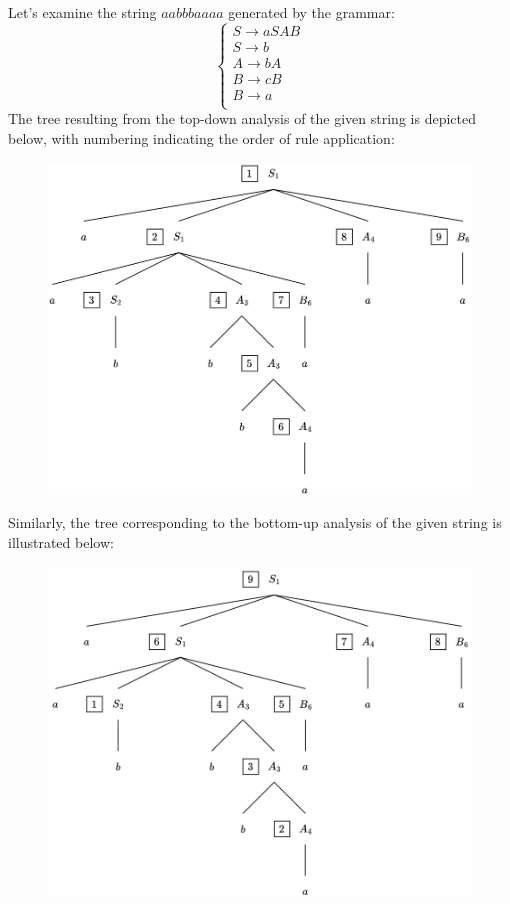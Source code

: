 \begin{example}
    Let's examine the string $aabbbaaaa$ generated by the grammar: 
    \[\begin{cases}
        S \rightarrow aSAB \\
        S \rightarrow b \\
        A \rightarrow bA \\
        B \rightarrow cB \\
        B \rightarrow a \\
    \end{cases}\]
    The tree resulting from the top-down analysis of the given string is depicted below, with numbering indicating the order of rule application:
    \begin{figure}[H]
        \centering
        \includegraphics[width=0.75\linewidth]{images/tda.png}
    \end{figure}
    Similarly, the tree corresponding to the bottom-up analysis of the given string is illustrated below: 
    \begin{figure}[H]
        \centering
        \includegraphics[width=0.75\linewidth]{images/bua.png}
    \end{figure}
\end{example}